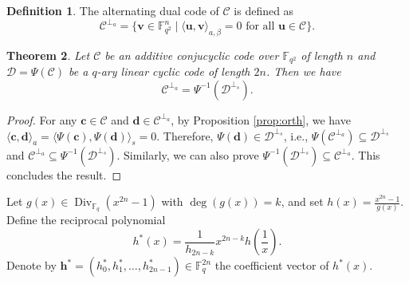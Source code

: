 \documentclass{aims}
\numberwithin{equation}{section}
\newtheorem{theorem}{Theorem}[section]
\theoremstyle{definition}
\newtheorem{definition}[theorem]{Definition}
\newcommand{\F}{\mathbb{F}}
\newcommand{\Div}{\operatorname{Div}}
\begin{document}
\begin{definition}\label{def:altdual}
	The alternating dual code of $\mathcal{C}$ is defined as
	\[
	\mathcal{C}^{\perp_a} = \{ \pmb{v} \in \F_{q^2}^n \mid \langle \pmb{u}, \pmb{v} \rangle_{a,\beta} = 0 \text{ for all } \pmb{u} \in \mathcal{C} \}.
	\]
\end{definition}


\begin{theorem}\label{sd22323}
	Let $\mathcal{C}$ be an additive conjucyclic code over $\F_{q^2}$ of length $n$ and $\mathcal{D} = \Psi(\mathcal{C})$ be a $q$-ary linear cyclic code of length $2n$. Then we have
	\[
	\mathcal{C}^{\perp_a} = \Psi^{-1}(\mathcal{D}^{\perp_s}).
	\]
\end{theorem}
\begin{proof}
	For any $\mathbf{c}\in\mathcal{C}$ and $\mathbf{d}\in\mathcal{C}^{\perp_a}$, by Proposition \ref{prop:orth}, we have $\langle\mathbf{c},\mathbf{d}\rangle_a = \langle\Psi(\mathbf{c}),\Psi(\mathbf{d})\rangle_s = 0$. Therefore, $\Psi(\mathbf{d})\in\mathcal{D}^{\perp_s}$, i.e., $\Psi(\mathcal{C}^{\perp_a})\subseteq\mathcal{D}^{\perp_s}$ and $\mathcal{C}^{\perp_a}\subseteq\Psi^{-1}(\mathcal{D}^{\perp_s})$. Similarly, we can also prove $\Psi^{-1}(\mathcal{D}^{\perp_s})\subseteq\mathcal{C}^{\perp_a}$. This concludes the result.
\end{proof}



Let $g(x) \in \Div_{\F_q}(x^{2n}-1)$ with $\deg(g(x)) = k$, and set $h(x) = \frac{x^{2n}-1}{g(x)}$. Define the reciprocal polynomial
\[
h^*(x) = \frac{1}{h_{2n-k}} x^{2n-k} h\!\left(\frac{1}{x}\right).
\]
 Denote by $\pmb{h^*} = (h_0^*, h_1^*, \dots, h_{2n-1}^*) \in \F_q^{2n}$ the coefficient vector of $h^*(x)$.
\end{document}
